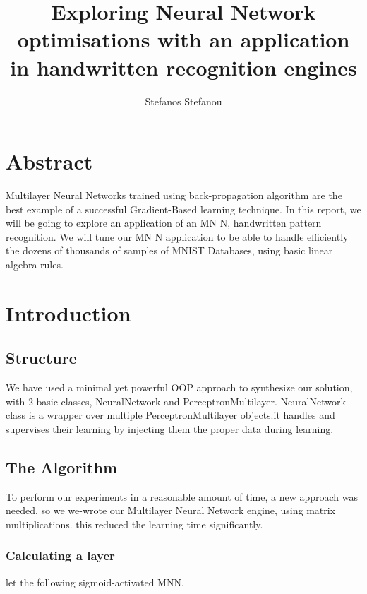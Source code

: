 \documentclass{proc}
\title{Exploring Neural Network optimisations with an application in handwritten recognition engines}
\author{Stefanos Stefanou}
\begin{document}
	\maketitle
	\section{Abstract}
	Multilayer Neural Networks trained using back-propagation algorithm are the best example of a successful
	Gradient-Based learning technique. In this report, we will be going to explore an application of an MN N, handwritten pattern recognition. We will tune our MN N application to be able to handle efficiently the dozens of thousands of samples of MNIST Databases, using basic linear algebra rules.
	\section{Introduction}
	\subsection{Structure}
	We have used a minimal yet powerful OOP approach to synthesize our solution, with 2 basic classes, NeuralNetwork and PerceptronMultilayer. NeuralNetwork class is a wrapper over multiple PerceptronMultilayer objects.it handles and supervises their learning by injecting them the proper data during learning.
	\subsection{The Algorithm}
	To perform our experiments in a reasonable amount of time, a new approach was needed. so we we-wrote our Multilayer Neural Network engine, using matrix multiplications. this reduced the learning time significantly.
	\subsubsection{Calculating a layer}
	let the following sigmoid-activated MNN.
	
\end{document}
